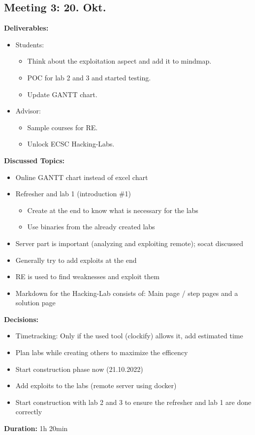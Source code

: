 \subsection*{Meeting 3: 20. Okt.}
\textbf{Deliverables:} 
\begin{itemize}
    \item Students:
    \begin{itemize}
        \item Think about the exploitation aspect and add it to mindmap.
        \item POC for lab 2 and 3 and started testing.
        \item Update GANTT chart.
    \end{itemize}
    \item Advisor:
    \begin{itemize}
        \item Sample courses for RE.
        \item Unlock ECSC Hacking-Labs. 
    \end{itemize}
\end{itemize}
\textbf{Discussed Topics:} 
\begin{itemize}
    \item Online GANTT chart instead of excel chart
    \item Refresher and lab 1 (introduction \#1)
    \begin{itemize}
        \item Create at the end to know what is necessary for the labs
        \item Use binaries from the already created labs
    \end{itemize}
    \item Server part is important (analyzing and exploiting remote); socat discussed
    \item Generally try to add exploits at the end
    \item RE is used to find weaknesses and exploit them
    \item Markdown for the Hacking-Lab consists of: Main page / step pages and a solution page
\end{itemize}
\textbf{Decisions:}
\begin{itemize}
    \item Timetracking: Only if the used tool (clockify) allows it, add estimated time
    \item Plan labs while creating others to maximize the efficency
    \item Start construction phase now (21.10.2022)
    \item Add exploits to the labs (remote server using docker)
    \item Start construction with lab 2 and 3 to ensure the refresher and lab 1 are done correctly
\end{itemize}
\textbf{Duration:} 1h 20min

